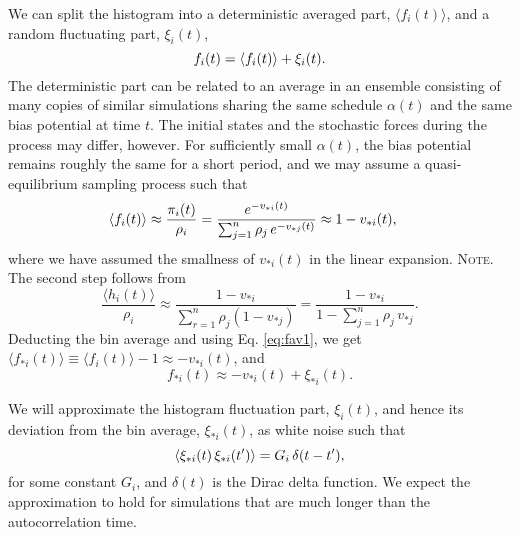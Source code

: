 \documentclass[reprint, superscriptaddress, floatfix]{revtex4-1}
\newcommand{\note}[1]{{\color{DarkGreen}\footnotesize \textsc{Note.} #1}}
\begin{document}
We can split the histogram into
a deterministic averaged part, $\langle f_i(t) \rangle$,
and a random fluctuating part, $\xi_i(t)$,
%
\begin{equation}
  f_i(t) =
  \langle f_i(t) \rangle
  +
  \xi_i(t)
  .
  \notag
\end{equation}
%
The deterministic part can be related
to an average in an ensemble consisting of
many copies of similar simulations
sharing the same schedule $\alpha(t)$
and the same bias potential at time $t$.
%
The initial states and the stochastic forces
during the process may differ, however.
%
For sufficiently small $\alpha(t)$,
the bias potential remains roughly the same for a short period,
and we may assume a quasi-equilibrium sampling process
such that
%
\begin{align}
  \langle f_i(t) \rangle
  &\approx
  \frac{ \pi_i(t) } { \rho_i }
  =
  \frac{                          e^{-v_{*i}(t)} }
       { \sum_{j = 1}^n \rho_j \, e^{-v_{*j}(t)} }
  \approx
  1 - v_{*i}(t)
  ,
  \notag
\end{align}
%
where we have assumed the smallness
of $v_{*i}(t)$ in the linear expansion.
%
\note{
The second step follows from
$$
\frac{ \langle h_i(t) \rangle }
     { \rho_i }
\approx
\frac{                       1 - v_{*i}  }
     { \sum_{ r = 1 }^n \rho_j (1 - v_{*j}) }
=
\frac{                       1 - v_{*i}  }
     { 1 - \sum_{ j = 1 }^n \rho_j \, v_{*j} }
.
$$
}%
%
Deducting the bin average and using Eq. \eqref{eq:fav1}, we get
$\langle f_{*i}(t) \rangle \equiv \langle f_i(t) \rangle - 1 \approx - v_{*i}(t)$,
and
%
\begin{equation}
  f_{*i}(t) \approx - v_{*i}(t) + \xi_{*i}(t)
  .
  \label{eq:sh_ave}
\end{equation}


We will approximate the histogram fluctuation part, $\xi_i(t)$,
and hence its deviation from the bin average, $\xi_{*i}(t)$,
as white noise such that
\begin{equation}
  \langle \xi_{*i}(t) \, \xi_{*i}(t') \rangle
  = G_i \, \delta(t - t')
  ,
  \notag
\end{equation}
for some constant $G_i$,
and $\delta(t)$ is the Dirac delta function.
%
We expect the approximation to hold
for simulations that are
much longer than the autocorrelation time.
\end{document}
